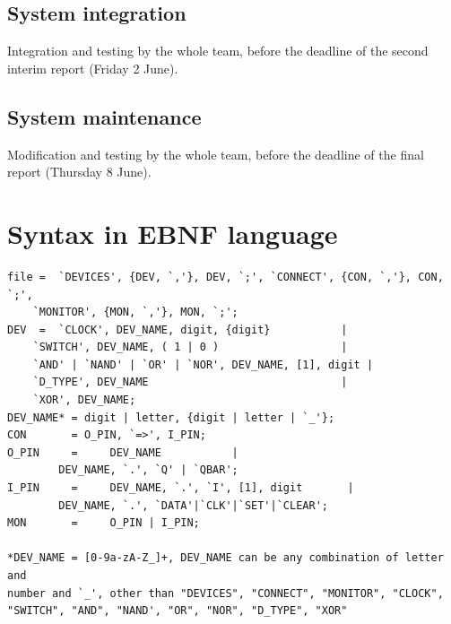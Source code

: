 \documentclass[12pt]{article}
\begin{document}
\subsection{System integration}
Integration and testing by the whole team, before the deadline of the second interim report (Friday 2 June).

\subsection{System maintenance}
Modification and testing by the whole team, before the deadline of the final report (Thursday 8 June).

\section{Syntax in EBNF language}
\begin{lstlisting}[basicstyle=\small]
file =  `DEVICES', {DEV, `,'}, DEV, `;', `CONNECT', {CON, `,'}, CON, `;',
	`MONITOR', {MON, `,'}, MON, `;';
DEV  =  `CLOCK', DEV_NAME, digit, {digit}  			|
	`SWITCH', DEV_NAME, ( 1 | 0 )          			|
	`AND' | `NAND' | `OR' | `NOR', DEV_NAME, [1], digit	|
	`D_TYPE', DEV_NAME                  			|
	`XOR', DEV_NAME;
DEV_NAME* =	digit | letter, {digit | letter | `_'};
CON       =	O_PIN, `=>', I_PIN;
O_PIN     =  	DEV_NAME		   |
		DEV_NAME, `.', `Q' | `QBAR';
I_PIN     =  	DEV_NAME, `.', `I', [1], digit		 |
		DEV_NAME, `.', `DATA'|`CLK'|`SET'|`CLEAR';
MON       =     O_PIN | I_PIN;

*DEV_NAME = [0-9a-zA-Z_]+, DEV_NAME can be any combination of letter and 
number and `_', other than "DEVICES", "CONNECT", "MONITOR", "CLOCK", 
"SWITCH", "AND", "NAND', "OR", "NOR", "D_TYPE", "XOR"
\end{lstlisting}
\end{document}
